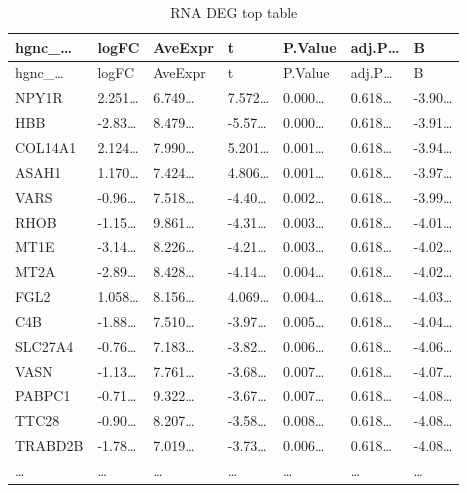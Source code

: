 \documentclass[
]{article}
\begin{document}
\begin{longtable}[]{@{}lllllll@{}}
\caption{\label{tab:RNA-DEG-top-table}RNA DEG top table}\tabularnewline
\toprule\noalign{}
hgnc\_\ldots{} & logFC & AveExpr & t & P.Value & adj.P\ldots{} & B \\
\midrule\noalign{}
\endfirsthead
\toprule\noalign{}
hgnc\_\ldots{} & logFC & AveExpr & t & P.Value & adj.P\ldots{} & B \\
\midrule\noalign{}
\endhead
\bottomrule\noalign{}
\endlastfoot
NPY1R & 2.251\ldots{} & 6.749\ldots{} & 7.572\ldots{} & 0.000\ldots{} & 0.618\ldots{} & -3.90\ldots{} \\
HBB & -2.83\ldots{} & 8.479\ldots{} & -5.57\ldots{} & 0.000\ldots{} & 0.618\ldots{} & -3.91\ldots{} \\
COL14A1 & 2.124\ldots{} & 7.990\ldots{} & 5.201\ldots{} & 0.001\ldots{} & 0.618\ldots{} & -3.94\ldots{} \\
ASAH1 & 1.170\ldots{} & 7.424\ldots{} & 4.806\ldots{} & 0.001\ldots{} & 0.618\ldots{} & -3.97\ldots{} \\
VARS & -0.96\ldots{} & 7.518\ldots{} & -4.40\ldots{} & 0.002\ldots{} & 0.618\ldots{} & -3.99\ldots{} \\
RHOB & -1.15\ldots{} & 9.861\ldots{} & -4.31\ldots{} & 0.003\ldots{} & 0.618\ldots{} & -4.01\ldots{} \\
MT1E & -3.14\ldots{} & 8.226\ldots{} & -4.21\ldots{} & 0.003\ldots{} & 0.618\ldots{} & -4.02\ldots{} \\
MT2A & -2.89\ldots{} & 8.428\ldots{} & -4.14\ldots{} & 0.004\ldots{} & 0.618\ldots{} & -4.02\ldots{} \\
FGL2 & 1.058\ldots{} & 8.156\ldots{} & 4.069\ldots{} & 0.004\ldots{} & 0.618\ldots{} & -4.03\ldots{} \\
C4B & -1.88\ldots{} & 7.510\ldots{} & -3.97\ldots{} & 0.005\ldots{} & 0.618\ldots{} & -4.04\ldots{} \\
SLC27A4 & -0.76\ldots{} & 7.183\ldots{} & -3.82\ldots{} & 0.006\ldots{} & 0.618\ldots{} & -4.06\ldots{} \\
VASN & -1.13\ldots{} & 7.761\ldots{} & -3.68\ldots{} & 0.007\ldots{} & 0.618\ldots{} & -4.07\ldots{} \\
PABPC1 & -0.71\ldots{} & 9.322\ldots{} & -3.67\ldots{} & 0.007\ldots{} & 0.618\ldots{} & -4.08\ldots{} \\
TTC28 & -0.90\ldots{} & 8.207\ldots{} & -3.58\ldots{} & 0.008\ldots{} & 0.618\ldots{} & -4.08\ldots{} \\
TRABD2B & -1.78\ldots{} & 7.019\ldots{} & -3.73\ldots{} & 0.006\ldots{} & 0.618\ldots{} & -4.08\ldots{} \\
\ldots{} & \ldots{} & \ldots{} & \ldots{} & \ldots{} & \ldots{} & \ldots{} \\
\end{longtable}
\end{document}
